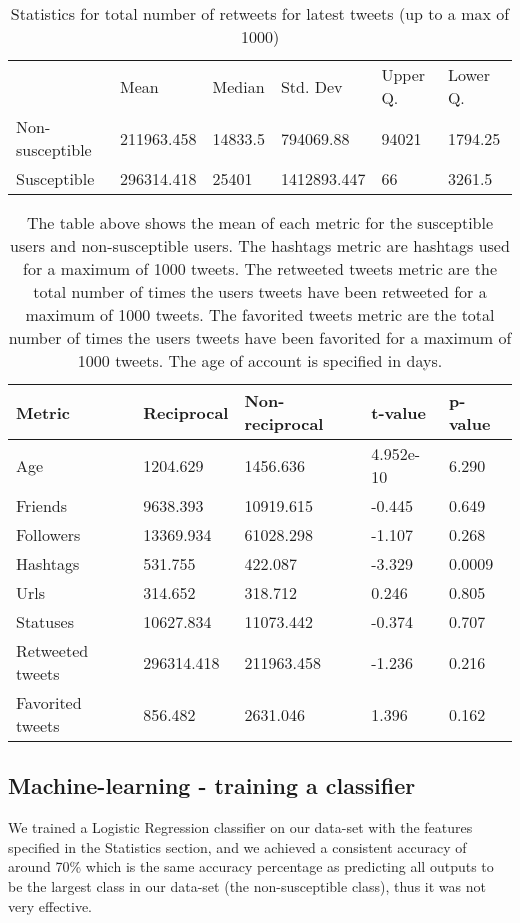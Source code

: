\documentclass[10pt]{IEEEtran}
\begin{document}
\begin{table}[ht]
\begin{tabular}{llllll}
\textbf{}       & Mean       & Median  & Std. Dev    & Upper Q. & Lower Q. \\
Non-susceptible & 211963.458 & 14833.5 & 794069.88   & 94021    & 1794.25  \\
Susceptible     & 296314.418 & 25401   & 1412893.447 & 66       & 3261.5  
\end{tabular}
\caption{Statistics for total number of retweets for latest tweets (up to a max of 1000)}
\end{table}

\begin{table}[ht]
\centering
\begin{tabular}{lllll}
\hline
Metric & Reciprocal & Non-reciprocal & t-value & p-value \\ \hline
Age & 1204.629 & 1456.636 & 4.952e-10 & 6.290 \\
Friends & 9638.393 & 10919.615 & -0.445 & 0.649 \\
Followers & 13369.934 & 61028.298 & -1.107 & 0.268 \\
Hashtags & 531.755 & 422.087 & -3.329 & 0.0009 \\
Urls & 314.652 & 318.712 & 0.246 & 0.805 \\
Statuses & 10627.834 & 11073.442 & -0.374 & 0.707 \\
Retweeted tweets & 296314.418 & 211963.458 & -1.236 & 0.216 \\
Favorited tweets & 856.482 & 2631.046 & 1.396 & 0.162 \\ \hline
\end{tabular}
\caption{The table above shows the mean of each metric for the susceptible users and non-susceptible users. The hashtags metric are hashtags used for a maximum of 1000 tweets. The retweeted tweets metric are the total number of times the users tweets have been retweeted for a maximum of 1000 tweets. The favorited tweets metric are the total number of times the users tweets have been favorited for a maximum of 1000 tweets. The age of account is specified in days.}
\end{table}
\subsection{Machine-learning - training a classifier}
We trained a Logistic Regression classifier on our data-set with the features specified in the Statistics section, and we achieved a consistent accuracy of around 70\% which is the same accuracy percentage as predicting all outputs to be the largest class in our data-set (the non-susceptible class), thus it was not very effective.  
\end{document}
